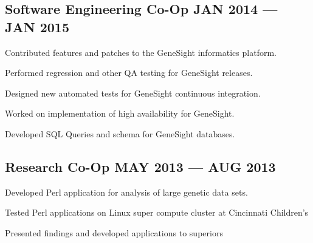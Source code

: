 \subsection{{Software Engineering Co-Op \hfill JAN 2014 --- JAN 2015}}
\begin{zitemize}
\item Contributed features and patches to the GeneSight informatics platform.
\item Performed regression and other QA testing for GeneSight releases.
\item Designed new automated tests for GeneSight continuous integration.
\item Worked on implementation of high availability for GeneSight.
\item Developed SQL Queries and schema for GeneSight databases.
\end{zitemize}

\subsection{{Research Co-Op \hfill MAY 2013 --- AUG 2013}}
\begin{zitemize}
\item Developed Perl application for analysis of large genetic data sets.
\item Tested Perl applications on Linux super compute cluster at Cincinnati Children's
\item Presented findings and developed applications to superiors
\end{zitemize}